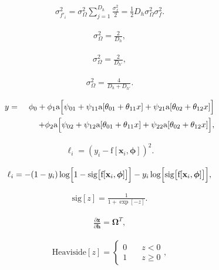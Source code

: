\documentclass[letterpaper,twoside,openany, titlepage,oldfontcommands,titles,dvipsnames]{memoir}
\begin{document}
\begin{eqnarray}
 \sigma^{2}_{f'_{i}} = \sigma_\Omega^2 \sum_{j=1}^{D_h} \frac{\sigma_{f}^2}{2} = \frac{1}{2}D_{h} \sigma_\Omega^2 \sigma_{f}^2.
 \end{eqnarray}

\begin{eqnarray}\label{eq:train2_init_forward}
 \sigma_\Omega^2 = \frac{2}{D_h}, 
 \end{eqnarray}

\begin{eqnarray}\label{eq:train2_init_back}
 \sigma_\Omega^2 = \frac{2}{D_{h'}}, 
 \end{eqnarray}

\begin{eqnarray}
 \sigma_\Omega^2 = \frac{4}{D_{h}+D_{h'}}. 
 \end{eqnarray}

\begin{eqnarray}
 y &=& \phi_{0}+\phi_{1}\mbox{a}\Bigl[\psi_{01} + \psi_{11}\mbox{a}[\theta_{01} + \theta_{11}x] + \psi_{21}\mbox{a}[\theta_{02} + \theta_{12}x]\Bigr]\nonumber \\
 &&\hspace{0.55cm}+\phi_{2}\mbox{a}\Bigl[\psi_{02} + \psi_{12}\mbox{a}[\theta_{01} + \theta_{11}x] + \psi_{22}\mbox{a}[\theta_{02} + \theta_{12}x]\Bigr], 
 \end{eqnarray}

\begin{eqnarray}
  \ell_i = (y_i-\mbox{f}[\mathbf{x}_i,\boldsymbol\phi])^2.
 \end{eqnarray}

\begin{eqnarray}
 \ell_{i} = -(1-y_{i})\log\Bigl[1-\mbox{sig}\bigl[\mbox{f}[\mathbf{x}_i,\boldsymbol\phi]\bigr]\Bigr] - y_{i}\log\Bigl[\mbox{sig}\bigl[\mbox{f}[\mathbf{x}_i,\boldsymbol\phi]\bigr]\Bigr],
 \end{eqnarray}

\begin{eqnarray}\label{eq:train2_logistic}
 \mbox{sig}[z] = \frac{1}{1+\exp[-z]}.
 \end{eqnarray}

\begin{eqnarray}
 \frac{\partial \mathbf{z}}{\partial \mathbf{h}} = \boldsymbol\Omega^{T},
 \end{eqnarray}

\begin{eqnarray}
 \mbox{Heaviside}[z] = \begin{cases} 0 & \quad z <0 \\ 1 & \quad z\geq 0\end{cases},
 \end{eqnarray}
\end{document}
